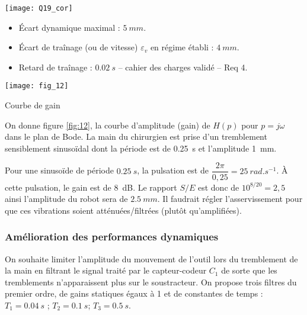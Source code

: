 \ifprof
\begin{marginfigure}
\centering
\texttt{[image: Q19\_cor]}
\end{marginfigure}
\begin{corrige}
\begin{itemize}
\item Écart dynamique maximal : $\SI{5}{mm}$.
\item Écart de traînage (ou de vitesse) $\varepsilon_v$ en régime établi : $\SI{4}{mm}$.
\item Retard de traînage : $\SI{0,02}{s}$ -- cahier des charges validé -- Req 4.
\end{itemize}
\end{corrige}
\else
\fi


\ifprof
\else
\begin{marginfigure}
\texttt{[image: fig\_12]}
\caption{Courbe de gain \label{fig:12}}
\end{marginfigure}

On donne figure \ref{fig:12}, la courbe d’amplitude (gain) de $H(p)$ pour $p = j\omega$ dans le plan de Bode. 
La main du chirurgien est prise d’un tremblement sensiblement sinusoïdal dont la période est de \SI{0,25}{s} et l’amplitude \SI{1}{mm}. 
\fi


\ifprof
\begin{corrige}
Pour une sinusoïde de période $\SI{0,25}{s}$, la pulsation est de $\dfrac{2\pi}{0,25} = \SI{25}{rad.s^{-1}}$.
À cette pulsation, le gain est de \SI{8}{dB}. Le rapport $S/E$ est donc de $10^{8/20} = 2,5$ ainsi l'amplitude du robot sera de $\SI{2,5}{mm}$. Il faudrait régler l'asservissement pour que ces vibrations soient atténuées/filtrées (plutôt qu'amplifiées).
\end{corrige}
\else
\fi

\subsubsection*{Amélioration des performances dynamiques}
\ifprof
\else
On souhaite limiter l’amplitude du mouvement de l’outil lors du tremblement de la main en  filtrant le signal traité par le capteur-codeur $C_1$ de sorte que les tremblements n’apparaissent plus sur le soustracteur. On propose trois filtres du premier ordre, de gains statiques égaux à 1 et de constantes de temps :	 $T_1 = \SI{0,04}{s}$ ; $T_2 = \SI{0,1}{s}$; $T_3 = \SI{0,5}{s}$.
\fi


